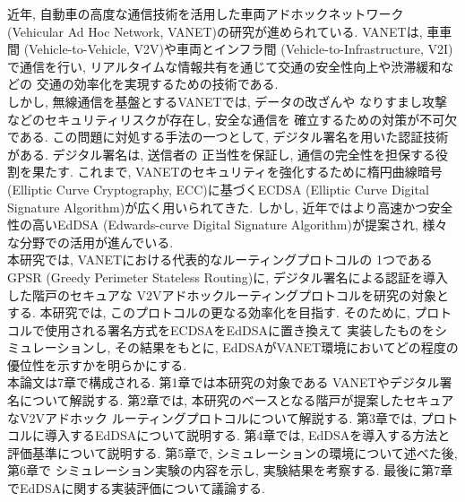 近年, 自動車の高度な通信技術を活用した車両アドホックネットワーク
 (Vehicular Ad Hoc Network, VANET)の研究が進められている. 
VANETは, 車車間 (Vehicle-to-Vehicle, V2V)や車両とインフラ間
 (Vehicle-to-Infrastructure, V2I)で通信を行い, 
リアルタイムな情報共有を通じて交通の安全性向上や渋滞緩和などの
交通の効率化を実現するための技術である. \\
\indent しかし, 無線通信を基盤とするVANETでは, データの改ざんや
なりすまし攻撃などのセキュリティリスクが存在し, 安全な通信を
確立するための対策が不可欠である. この問題に対処する手法の一つとして, 
デジタル署名を用いた認証技術がある. デジタル署名は, 送信者の
正当性を保証し, 通信の完全性を担保する役割を果たす. これまで, 
VANETのセキュリティを強化するために楕円曲線暗号 
(Elliptic Curve Cryptography, ECC)に基づくECDSA 
(Elliptic Curve Digital Signature Algorithm)が広く用いられてきた. 
しかし, 近年ではより高速かつ安全性の高いEdDSA 
(Edwards-curve Digital Signature Algorithm)が提案され, 
様々な分野での活用が進んでいる. \\
\indent 本研究では, VANETにおける代表的なルーティングプロトコルの
1つであるGPSR (Greedy Perimeter Stateless Routing)に, 
デジタル署名による認証を導入した階戸\cite{shinato}のセキュアな
V2Vアドホックルーティングプロトコルを研究の対象とする. 
本研究では, このプロトコルの更なる効率化を目指す. そのために, 
プロトコルで使用される署名方式をECDSAをEdDSAに置き換えて
実装したものをシミュレーションし, その結果をもとに, 
EdDSAがVANET環境においてどの程度の優位性を示すかを明らかにする. \\
\indent 本論文は7章で構成される. 第1章では本研究の対象である
VANETやデジタル署名について解説する. 第2章では, 
本研究のベースとなる階戸\cite{shinato}が提案したセキュアなV2Vアドホック
ルーティングプロトコルについて解説する. 第3章では, 
プロトコルに導入するEdDSAについて説明する. 第4章では, 
EdDSAを導入する方法と評価基準について説明する. 第5章で, 
シミュレーションの環境について述べた後, 第6章で
シミュレーション実験の内容を示し, 実験結果を考察する. 
最後に第7章でEdDSAに関する実装評価について議論する. 

